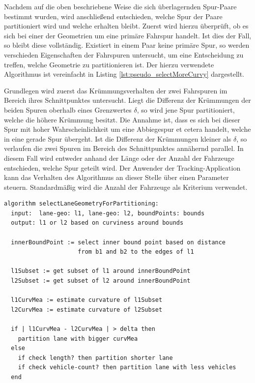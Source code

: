 Nachdem auf die oben beschriebene Weise die sich überlagernden Spur-Paare bestimmt wurden, wird anschließend
entschieden, welche Spur der Paare partitioniert wird und welche erhalten bleibt. Zuerst wird hierzu
überprüft, ob es sich bei einer der Geometrien um eine primäre Fahrspur handelt. Ist dies der Fall, so
bleibt diese vollständig. Existiert in einem Paar keine primäre Spur, so werden verschieden Eigenschaften
der Fahrspuren untersucht, um eine Entscheidung zu treffen, welche Geometrie zu partitionieren ist.
Der hierzu verwendete Algorithmus ist vereinfacht in Listing \ref{lst:pseudo_selectMoreCurvy} dargestellt.

Grundlegen wird zuerst das Krümmungsverhalten der zwei Fahrspuren im Bereich ihres Schnittpunktes untersucht.
Liegt die Differenz der Krümmungen der beiden Spuren oberhalb eines Grenzwertes $\delta$, so wird
jene Spur partitioniert, welche die höhere Krümmung besitzt. Die Annahme ist, dass es sich bei dieser
Spur mit hoher Wahrscheinlichkeit um eine Abbiegespur et cetera handelt, welche in eine gerade Spur übergeht.
Ist die Differenz der Krümmungen kleiner als $\delta$, so verlaufen die zwei Spuren im Bereich des Schnittpunktes
annähernd parallel. In diesem Fall wird entweder anhand der Länge oder der Anzahl der Fahrzeuge entschieden,
welche Spur geteilt wird. Der Anwender der Tracking-Application kann das Verhalten des Algorithmus an dieser Stelle
über einen Parameter steuern. Standardmäßig wird die Anzahl der Fahrzeuge als Kriterium verwendet.
\begin{lstlisting}[caption=Pseudocode Auswahl gekrümmtr Fahrspur, language=Pseudo, label=lst:pseudo_selectMoreCurvy]
algorithm selectLaneGeometryForPartitioning:
  input:  lane-geo: l1, lane-geo: l2, boundPoints: bounds
  output: l1 or l2 based on curviness around bounds

  innerBoundPoint := select inner bound point based on distance
                     from b1 and b2 to the edges of l1

  l1Subset := get subset of l1 around innerBoundPoint
  l2Subset := get subset of l2 around innerBoundPoint

  l1CurvMea := estimate curvature of l1Subset
  l2CurvMea := estimate curvature of l2Subset

  if | l1CurvMea - l2CurvMea | > delta then
    partition lane with bigger curvMea
  else
    if check length? then partition shorter lane
    if check vehicle-count? then partition lane with less vehicles 
  end
\end{lstlisting}

